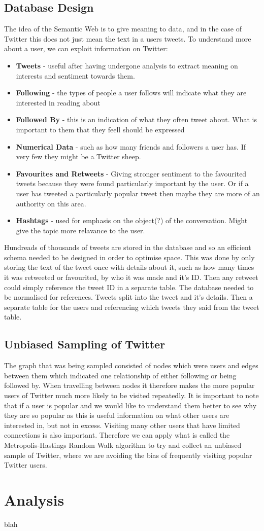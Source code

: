 \subsection{Database Design}
The idea of the Semantic Web is to give meaning to data, and in the case of Twitter this does not just mean the text in a users tweets. To understand more about a user, we can exploit information on Twitter:
\begin{itemize}
\item {\bf Tweets} - useful after having undergone analysis to extract meaning on interests and sentiment towards them. 
\item {\bf Following} - the types of people a user follows will indicate what they are interested in reading about
\item {\bf Followed By} - this is an indication of what they often tweet about. What is important to them that they feell should be expressed
\item {\bf Numerical Data} - such as how many friends and followers a user has. If very few they might be a Twitter sheep. 
\item {\bf Favourites and Retweets} - Giving stronger sentiment to the favourited tweets because they were found particularly important by the user. Or if a user has tweeted a particularly popular tweet then maybe they are more of an authority on this area. 
\item {\bf Hashtags} - used for emphasis on the object(?) of the conversation. Might give the topic more relavance to the user.
\end{itemize}
Hundreads of thousands of tweets are stored in the database and so an efficient schema needed to be designed in order to optimise space. This was done by only storing the text of the tweet once with details about it, such as how many times it was retweeted or favourited, by who it was made and it's ID. Then any retweet could simply reference the tweet ID in a separate table.
The database needed to be normalised for references. Tweets split into the tweet and it's details. Then a separate table for the users and referencing which tweets they said from the tweet table. 

\subsection{Unbiased Sampling of Twitter}
The graph that was being sampled consisted of nodes which were users and edges between them which indicated one relationship of either following or being followed by. When travelling between nodes it therefore makes the more popular users of Twitter much more likely to be visited repeatedly. It is important to note that if a user is popular and we would like to understand them better to see why they are so popular as this is useful information on what other users are interested in, but not in excess. Visiting many other users that have limited connections is also important. Therefore we can apply what is called the Metropolis-Hastings Random Walk algorithm to try and collect an unbiased sample of Twitter, where we are avoiding the bias of frequently visiting popular Twitter users.

\section{Analysis}
blah
